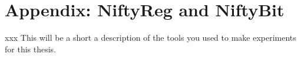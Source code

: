 
\appendix
%

\section*{Appendix: NiftyReg and NiftyBit}
\label{appendixlabel3}
xxx  This will be a short a description of the tools you used to make experiments for this thesis.